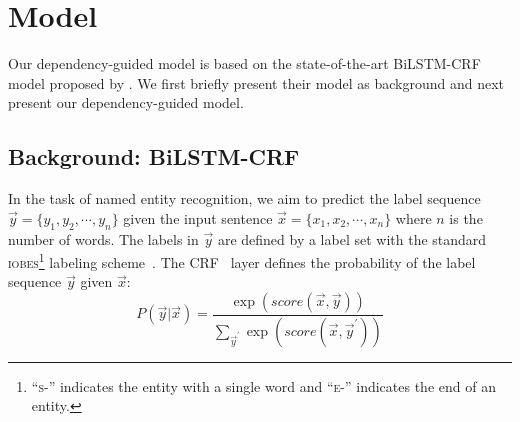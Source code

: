 

\section{Model}

Our dependency-guided model is based on the state-of-the-art BiLSTM-CRF model proposed by \citet{lample2016neural}.
We first briefly present their model  as background and next present our dependency-guided model.


\subsection{Background: BiLSTM-CRF}
In the task of named entity recognition, we aim to predict the label sequence $\vec{y} = \{y_1, y_2,\cdots, y_n\}$ given the input sentence $\vec{x}=\{x_1, x_2, \cdots, x_n\}$ where $n$ is the number of words.
The labels in $\vec{y}$ are defined by a label set with the standard \textsc{iobes}\footnote{``\textsc{s-}'' indicates the entity with a single word and ``\textsc{e-}'' indicates the end of an entity.} labeling scheme~\cite{ramshaw1999text,ratinov2009design}. 
The CRF~\cite{lafferty2001conditional} layer defines the probability of the label sequence $\vec{y}$ given $\vec{x}$:
\begin{equation}
P(\vec{y} \vert \vec{x})
=
\frac
{\exp ( score(\vec{x}, \vec{y})  )  }
{\sum_{\vec{y}^\prime }\exp ( score(\vec{x}, \vec{y}^\prime) )  }
\end{equation}

